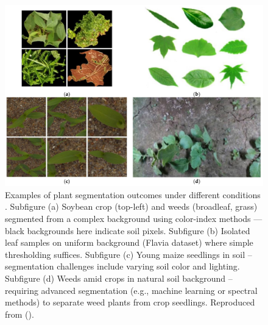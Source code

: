 \documentclass[letterpaper, notitlepage]{report}
\begin{document}
\begin{figure}[h!]
	\centering
	\includegraphics[width=0.9\linewidth]{./figures/segmentation-review.png}
	\caption[Examples of plant segmentation outcomes under different conditions]{Examples of plant segmentation outcomes under different conditions \parencite{Wu2021-gt}. Subfigure (a) Soybean crop (top-left) and weeds (broadleaf, grass) segmented from a complex background using color-index methods --- black backgrounds here indicate soil pixels. Subfigure (b) Isolated leaf samples on uniform background (Flavia dataset) where simple thresholding suffices. Subfigure (c) Young maize seedlings in soil – segmentation challenges include varying soil color and lighting. Subfigure (d) Weeds amid crops in natural soil background – requiring advanced segmentation (e.g., machine learning or spectral methods) to separate weed plants from crop seedlings. Reproduced from \citeauthor{Wu2021-gt} (\citeyear{Wu2021-gt}).}
	\label{fig:segmentation-example}
\end{figure}
%
\end{document}
